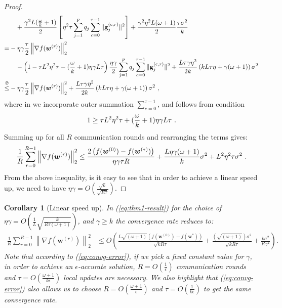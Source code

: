 \documentclass[11pt]{article}
\newtheorem{corollary}{Corollary}
\begin{document}
\begin{proof}
\begin{align}
     &\quad+\frac{\gamma^2 L(\frac{\omega}{k}+1)}{2}\left[{\eta^2\tau}\sum_{j=1}^pq_j\sum_{c=0}^{\tau-1}\|\mathbf{g}^{(c,r)}_{j}\|^2\right]+\frac{\gamma^2\eta^2 L(\omega+1)}{2}\frac{\tau \sigma^2}{k}\nonumber\\
     =&-\eta\gamma\frac{\tau}{2}\left\|\nabla f({\boldsymbol{w}}^{(r)})\right\|_2^2\nonumber\\
     &\quad-\left(1-{\tau L^2\eta^2\tau}-{(\frac{\omega}{k}+1)\eta\gamma L}{\tau}\right)\frac{\eta\gamma}{2}\sum_{j=1}^pq_j\sum_{c=0}^{\tau-1}\|\mathbf{g}^{(c,r)}_{j}\|^2+\frac{L\tau\gamma\eta^2 }{2k}\left(kL\tau\eta+\gamma(\omega+1)\right)\sigma^2\nonumber\\
     \stackrel{\text{\ding{193}}}{\leq}& -\eta\gamma\frac{\tau}{2}\left\|\nabla f({\boldsymbol{w}}^{(r)})\right\|_2^2+\frac{L\tau\gamma\eta^2 }{2k}\left(kL\tau\eta+\gamma(\omega+1)\right)\sigma^2 \ ,  \label{eq:finalll}
\end{align}
where in  we incorporate outer summation $\sum_{c=0}^{\tau-1}$, and   follows from condition 
\begin{align}\notag
   1\geq {\tau L^2\eta^2\tau}+(\frac{\omega}{k}+1)\eta\gamma L{\tau} \ . 
\end{align}
Summing up for all $R$ communication rounds and  rearranging the terms gives:
\begin{align}\notag
    \frac{1}{R}\sum_{r=0}^{R-1}\left\|\nabla f({\boldsymbol{w}}^{(r)})\right\|_2^2\leq \frac{2\left(f(\boldsymbol{w}^{(0)})-f(\boldsymbol{w}^{(*)})\right)}{\eta\gamma\tau R}+\frac{L\eta\gamma{(\omega+1)}}{k}\sigma^2+{L^2\eta^2\tau }\sigma^2 \ . 
\end{align}
From the above inequality, is it easy to see that in order to achieve a linear speed up, we need to have $\eta\gamma=O\left(\frac{\sqrt{k}}{\sqrt{R \tau}}\right)$.
\end{proof}


\begin{corollary}[Linear speed up] 
In (\ref{eq:thm1-result}) for the choice of  $\eta\gamma=O\left(\frac{1}{L}\sqrt{\frac{k}{R\tau\left(\omega+1\right)}}\right)$, and $\gamma\geq k$  the  convergence rate reduces to:
\begin{align}
    \frac{1}{R}\sum_{r=0}^{R-1}\left\|\nabla f({\boldsymbol{w}}^{(r)})\right\|_2^2&\leq O\left(\frac{L\sqrt{\left(\omega+1\right)}\left(f(\boldsymbol{w}^{(0)})-f(\boldsymbol{w}^{*})\right)}{\sqrt{kR\tau}}+\frac{\left(\sqrt{\left(\omega+1\right)}\right)\sigma^2}{\sqrt{kR\tau}}+\frac{k\sigma^2}{R\gamma^2}\right).\label{eq:convg-error}
\end{align}
Note that according to (\ref{eq:convg-error}), if we pick  a fixed constant value for  $\gamma$, in order to achieve an $\epsilon$-accurate solution, $R=O\left(\frac{1}{\epsilon}\right)$ communication rounds and $\tau=O\left(\frac{\omega+1}{k\epsilon}\right)$ local updates are necessary. We also highlight  that (\ref{eq:convg-error}) also allows us to choose $R=O\left(\frac{\omega+1}{\epsilon}\right)$ and $\tau=O\left(\frac{1}{k\epsilon}\right)$ to get the  same convergence rate.
\end{corollary}
\end{document}
